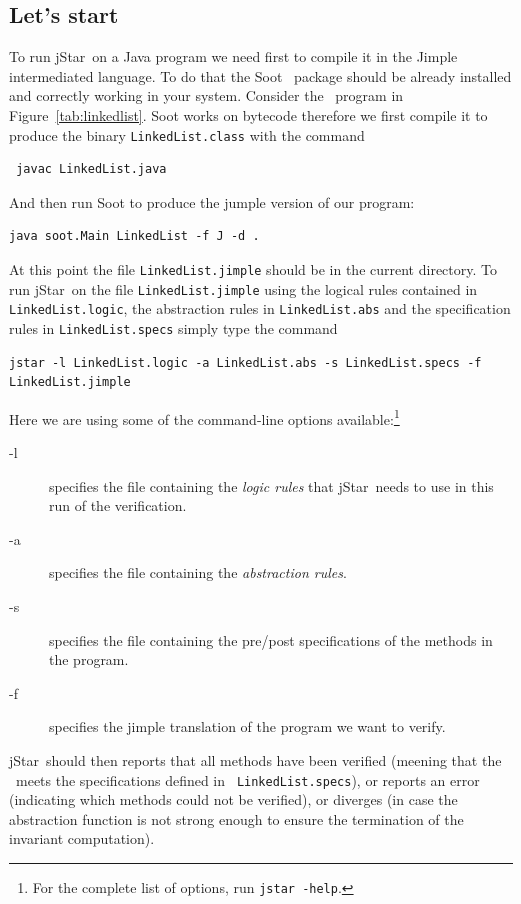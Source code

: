\documentclass[11pt]{article}
\newcommand{\jStar}{{\sf jStar}}
\begin{document}
\subsection{Let's start}
To run  \jStar \ on a Java program we need first to compile it in the
Jimple intermediated language. To do that the Soot~\cite{vall99soot} package
should be already installed and correctly working in your system. Consider the
\linkedlist \ program in Figure~\ref{tab:linkedlist}. Soot works on
bytecode therefore we first  compile it to produce the binary {\tt LinkedList.class}
with the command
\begin{verbatim}
 javac LinkedList.java
\end{verbatim}
And then run Soot to produce the jumple version of our program:
\begin{verbatim}
java soot.Main LinkedList -f J -d .
\end{verbatim}
At this point the file {\tt LinkedList.jimple} should be in the
current directory. To run \jStar \ on the file {\tt LinkedList.jimple}
using the logical rules contained in {\tt LinkedList.logic}, the
abstraction rules in {\tt LinkedList.abs} and the specification rules
in {\tt LinkedList.specs} simply type the command
\begin{verbatim}
jstar -l LinkedList.logic -a LinkedList.abs -s LinkedList.specs -f LinkedList.jimple
\end{verbatim}
Here we are using some of the command-line options available:\footnote{For 
the complete list of options, run {\tt jstar -help}.} 
\begin{description}
\item[-l] specifies the file containing the {\em logic rules} that
  \jStar \ needs to use in this run of the verification.
\item[-a] specifies the file containing the {\em abstraction rules}.
\item[-s] specifies the file containing the pre/post specifications of the methods in the program.
\item[-f] specifies the jimple translation of the program we want to
  verify.
\end{description}
\jStar \ should then reports that all methods have been verified (meening
that the \linkedlist \ meets the specifications defined in {\tt
  LinkedList.specs}), or reports an error (indicating which methods
could not be verified), or diverges (in case the abstraction function
is not strong enough to ensure the termination of the invariant
computation).
%
\end{document}
